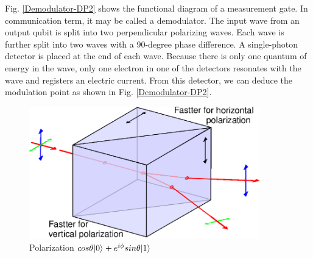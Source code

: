 \documentclass[oneside, letter, 12pt]{book}
\begin{document}
Fig. \ref{Demodulator-DP2} shows the functional diagram of a measurement gate. In communication term, it may be called a demodulator. The input wave from an output qubit is split into two perpendicular polarizing waves. Each wave is further split into two waves with a 90-degree phase difference. A single-photon detector is placed at the end of each wave. Because there is only one quantum of energy in the wave, only one electron in one of the detectors resonates with the wave and registers an electric current. From this detector, we can deduce the modulation point as shown in Fig. \ref{Demodulator-DP2}.

\begin{figure}[h]
\includegraphics[width=10cm]{pic/polarization-prism.eps}
\caption{Polarization $cos{\theta} \vert {0} \rangle_{} + e^{i \phi} sin{\theta} \vert {1} \rangle_{}$}
\label{Polarization-splitter}
\end{figure}
\end{document}
